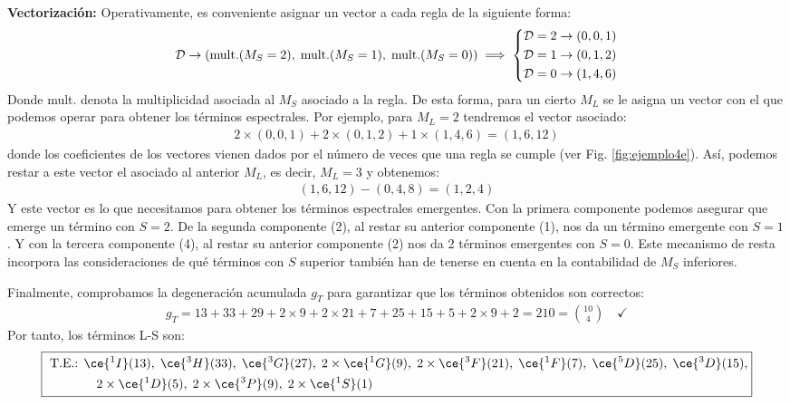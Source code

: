 \textbf{Vectorización:} Operativamente, es conveniente asignar un vector a cada regla de la siguiente forma: 
\begin{align*}
  \mathcal{D} \to  (\mathrm{mult.}( M_{S} = 2),\; \mathrm{mult.} (M_{S} = 1),\; \mathrm{mult.} (M_{S} = 0)) \implies 
  \begin{dcases}
    \mathcal{D} = 2 \to  (0,0,1)\\ 
    \mathcal{D} = 1 \to  (0,1,2)\\ 
    \mathcal{D} = 0 \to  (1,4,6)
  \end{dcases}
\end{align*}
Donde mult. denota la multiplicidad asociada al $M_{S}$ asociado a la regla. De esta forma, para un cierto $M_{L}$ se le asigna un vector con el que podemos operar para obtener los términos espectrales. Por ejemplo, para $M_{L} = 2$ tendremos el vector asociado:
\begin{align*}
2 \times (0,0,1) + 2 \times (0,1,2) + 1 \times (1,4,6) = (1,6,12)
\end{align*}
donde los coeficientes de los vectores vienen dados por el número de veces que una regla se cumple (ver Fig. \ref{fig:ejemplo4e}). Así, podemos restar a este vector el asociado al anterior $M_{L}$, es decir, $M_{L} = 3$ y obtenemos: 
\begin{align*}
(1,6,12) - (0,4,8) = (1,2,4)
\end{align*}
Y este vector es lo que necesitamos para obtener los términos espectrales emergentes. Con la primera componente podemos asegurar que emerge un término con $S = 2$. De la segunda componente (2), al restar su anterior componente (1), nos da un término emergente con $S = 1$. Y con la tercera componente (4), al restar su anterior componente (2) nos da 2 términos emergentes con $S = 0$. Este mecanismo de resta incorpora las consideraciones de qué términos con $S$ superior también han de tenerse en cuenta en la contabilidad de $M_{S}$ inferiores.\par
Finalmente, comprobamos la degeneración acumulada $g_{T}$ para garantizar que los términos obtenidos son correctos:
\begin{align*}
 g_{T} = 13 + 33 + 29 + 2 \times 9 + 2 \times 21 + 7 + 25 + 15 + 5 + 2 \times 9 + 2 = 210 = \binom{10}{4} \quad  \boxed{\checkmark}
\end{align*}
Por tanto, los términos L-S son: 
\begin{align*}
  \boxed{\text{ T.E.: } \begin{aligned}[t]
    &\ce{^{1}I}(13),\;  \ce{^{3}H}(33),\;  \ce{^{3}G}(27),\;  2\times\ce{^{1}G}(9),\;  2\times\ce{^{3}F}(21),\;  \ce{^{1}F}(7),\;  \ce{^{5}D}(25),\;  \ce{^{3}D}(15),\\ 
    &\quad 2\times\ce{^{1}D}(5),\;  2\times\ce{^{3}P}(9),\;  2\times\ce{^{1}S}(1)
  \end{aligned}}
\end{align*}

